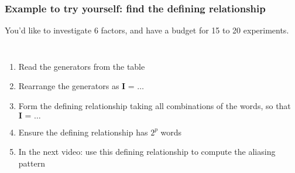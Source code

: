 \documentclass[handout,11pt,aspectratio=169,mathserif]{beamer}
\begin{document}
\begin{frame}\frametitle{Example to try yourself: find the defining relationship}
	
	\vspace{0.5cm}
	You'd like to investigate 6 factors, and have a budget for 15 to 20 experiments.
	
	\vspace{0.5cm}
	\begin{columns}[T]
			\begin{enumerate}
				\item	Read the generators from the table 
				\item	Rearrange the generators as  $\textbf{I = \ldots}$
			 	\item	Form the {\color{purple}defining relationship} taking all combinations of the words, so that $\textbf{I = \ldots}$
			 	\item	Ensure the defining relationship has $2^p$ words
				\item	In the next video: use this defining relationship to compute the aliasing pattern
			\end{enumerate}
			

	\end{columns}

	
\end{frame}
\end{document}
